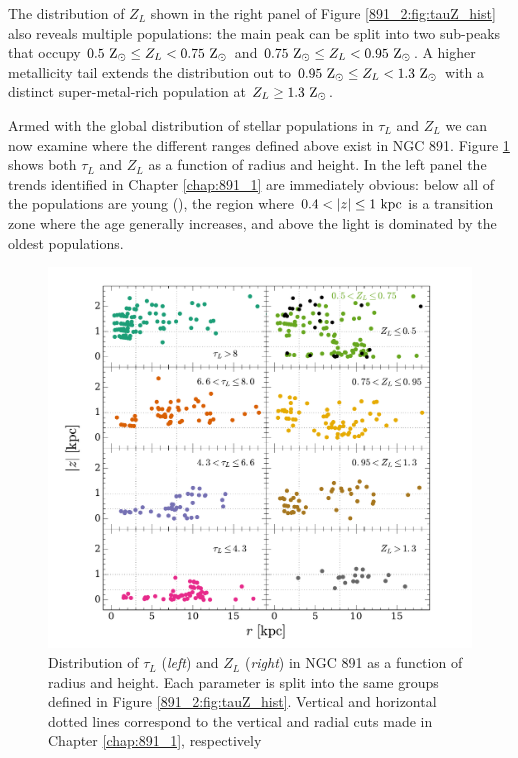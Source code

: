 The distribution of $Z_L$ shown in the right panel of Figure
\ref{891_2:fig:tauZ_hist} also reveals multiple populations: the main
peak can be split into two sub-peaks that occupy $0.5~\mathrm{\mathrm{Z}_{\odot}} \leq
Z_L < 0.75~\mathrm{\mathrm{Z}_{\odot}} $ and $0.75~\mathrm{\mathrm{Z}_{\odot}} \leq Z_L <
0.95~\mathrm{\mathrm{Z}_{\odot}} $. A higher metallicity tail extends the distribution
out to $0.95~\mathrm{\mathrm{Z}_{\odot}} \leq Z_L < 1.3~\mathrm{\mathrm{Z}_{\odot}} $ with a distinct
super-metal-rich population at $Z_L \geq1.3~\mathrm{\mathrm{Z}_{\odot}} $.

Armed with the global distribution of stellar populations in $\tau_L$
and $Z_L$ we can now examine where the different ranges defined above
exist in NGC 891. Figure \ref{891_2:fig:rz_tZ} shows both $\tau_L$ and
$Z_L$ as a function of radius and height. In the left panel the trends
identified in Chapter \ref{chap:891_1} are immediately obvious: below
 all of the populations are young (),
the region where $0.4 < |z| \leq 1~\mathrm{kpc} $ is a transition zone
where the age generally increases, and above  the light is
dominated by the oldest populations.

\begin{figure}
  \centering
  \includegraphics[width=\textwidth]{891_2/figs/rz_tZ.pdf}
  \caption[Distribution of $\tau_L$ and $Z_L$ as function of
    ($r,|z|$)]{\fixspacing\label{891_2:fig:rz_tZ}Distribution of
    $\tau_L$ (\emph{left}) and $Z_L$ (\emph{right}) in NGC 891 as a
    function of radius and height. Each parameter is split into the
    same groups defined in Figure \ref{891_2:fig:tauZ_hist}. Vertical
    and horizontal dotted lines correspond to the vertical and radial
    cuts made in Chapter \ref{chap:891_1}, respectively}
\end{figure}

